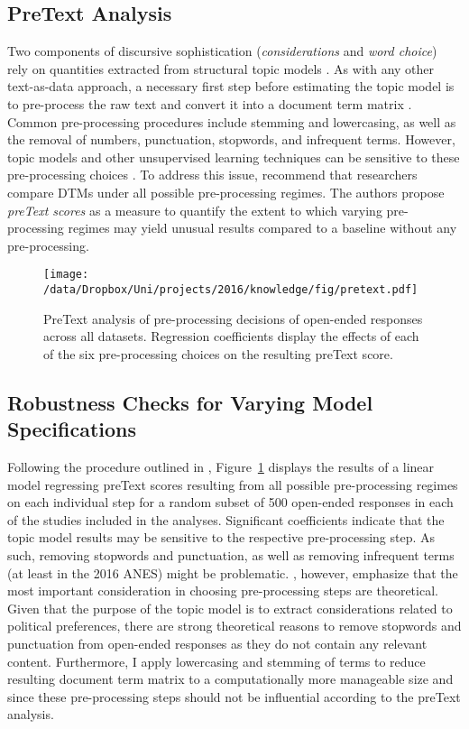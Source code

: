 \subsection{PreText Analysis}
Two components of discursive sophistication (\textit{considerations} and \textit{word choice}) rely on quantities extracted from structural topic models \citep{roberts2014structural}. As with any other text-as-data approach, a necessary first step before estimating the topic model is to pre-process the raw text and convert it into a document term matrix \citep[DTM, see for example][]{manning2008introduction}. Common pre-processing procedures include stemming and lowercasing, as well as the removal of numbers, punctuation, stopwords, and infrequent terms. However, topic models and other unsupervised learning techniques can be sensitive to these pre-processing choices \citep[c.f.,][]{denny2018text}. To address this issue, \citet{denny2018text} recommend that researchers compare DTMs under all possible pre-processing regimes. The authors propose \textit{preText scores} as a measure to quantify the extent to which varying pre-processing regimes may yield unusual results compared to a baseline without any pre-processing.

\begin{figure}[h]
\centering\texttt{[image: /data/Dropbox/Uni/projects/2016/knowledge/fig/pretext.pdf]}
    \caption[PreText analysis of pre-processing decisions of open-ended responses across all datasets]{PreText analysis of pre-processing decisions of open-ended responses across all datasets. Regression coefficients display the effects of each of the six pre-processing choices on the resulting preText score.}\label{fig:pretext}
\end{figure}

\clearpage
\subsection{Robustness Checks for Varying Model Specifications}

Following the procedure outlined in \citet{denny2018text}, Figure~\ref{fig:pretext} displays the results of a linear model regressing preText scores resulting from all possible pre-processing regimes on each individual step for a random subset of 500 open-ended responses in each of the studies included in the analyses. Significant coefficients indicate that the topic model results may be sensitive to the respective pre-processing step. As such, removing stopwords and punctuation, as well as removing infrequent terms (at least in the 2016 ANES) might be problematic. \citet{denny2018text}, however, emphasize that the most important consideration in choosing pre-processing steps are theoretical. Given that the purpose of the topic model is to extract considerations related to political preferences, there are strong theoretical reasons to remove stopwords and punctuation from open-ended responses as they do not contain any relevant content. Furthermore, I apply lowercasing and stemming of terms to reduce resulting document term matrix to a computationally more manageable size and since these pre-processing steps should not be influential according to the preText analysis.

